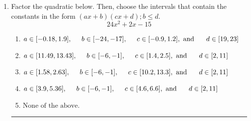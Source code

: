 \documentclass[14pt]{extbook}
\newcommand{\litem}[1]{\item#1\hspace*{-1cm}\rule{\textwidth}{0.4pt}}
\begin{document}
\begin{enumerate}
{\begin{enumerate}[label=\Alph*.]
\end{enumerate} }
\litem{
Factor the quadratic below. Then, choose the intervals that contain the constants in the form $(ax+b)(cx+d); b \leq d.$\[ 24x^{2} +2 x -15 \]\begin{enumerate}[label=\Alph*.]
\item \( a \in [-0.18, 1.9], \hspace*{5mm} b \in [-24, -17], \hspace*{5mm} c \in [-0.9, 1.2], \text{ and } \hspace*{5mm} d \in [19, 23] \)
\item \( a \in [11.49, 13.43], \hspace*{5mm} b \in [-6, -1], \hspace*{5mm} c \in [1.4, 2.5], \text{ and } \hspace*{5mm} d \in [2, 11] \)
\item \( a \in [1.58, 2.63], \hspace*{5mm} b \in [-6, -1], \hspace*{5mm} c \in [10.2, 13.3], \text{ and } \hspace*{5mm} d \in [2, 11] \)
\item \( a \in [3.9, 5.36], \hspace*{5mm} b \in [-6, -1], \hspace*{5mm} c \in [4.6, 6.6], \text{ and } \hspace*{5mm} d \in [2, 11] \)
\item \( \text{None of the above.} \)


\end{enumerate}}
\end{enumerate}
\end{document}
